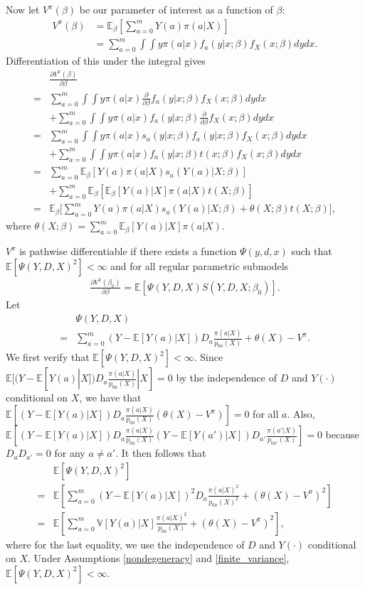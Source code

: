 \documentclass[letterpaper]{article} \usepackage{aaai19}  \usepackage{times}  \usepackage{helvet}  \usepackage{courier}  \usepackage{url}  \usepackage{graphicx}  \frenchspacing  \usepackage{comment}
\begin{document}
Now let $V^\pi(\beta)$ be our parameter of interest as a function of $\beta$:
\begin{align*}
	V^\pi(\beta)&=\mathbb{E}_{\beta}[\sum_{a=0}^m Y(a)\pi(a|X)]\\
	&=\sum_{a=0}^m \int\int y\pi(a|x) f_a(y|x;\beta)f_X(x;\beta)dydx.
\end{align*}
Differentiation of this under the integral gives
\begin{align*}
	&\frac{\partial V^\pi(\beta)}{\partial \beta} \\
	=& \sum_{a=0}^m \int\int y\pi(a|x) \frac{\partial}{\partial \beta}f_a(y|x;\beta)f_X(x;\beta)dydx\\
	&+\sum_{a=0}^m \int\int y\pi(a|x)f_a(y|x;\beta)\frac{\partial}{\partial \beta}f_X(x;\beta)dydx\\
	=& \sum_{a=0}^m \int\int y\pi(a|x) s_a(y|x;\beta) f_a(y|x;\beta)f_X(x;\beta)dydx\\
	&+\sum_{a=0}^m \int\int y\pi(a|x)f_a(y|x;\beta) t(x;\beta)f_X(x;\beta)dydx\\
	=& \sum_{a=0}^m \mathbb{E}_{\beta}[Y(a)\pi(a|X)s_a(Y(a)|X;\beta)]\\
	&+\sum_{a=0}^m \mathbb{E}_{\beta}[\mathbb{E}_{\beta}[Y(a)|X]\pi(a|X)t(X;\beta)]\\
	=& \mathbb{E}_{\beta}\bigl[\sum_{a=0}^m Y(a)\pi(a|X)s_a(Y(a)|X;\beta)+\theta(X;\beta)t(X;\beta)\bigr],
\end{align*}
where $\theta(X;\beta)=\sum_{a=0}^m \mathbb{E}_{\beta}[Y(a)|X]\pi(a|X)$.

$V^\pi$ is pathwise differentiable if there exists a function $\Psi(y,d,x)$ such that $\mathbb{E}[\Psi(Y,D,X)^2]<\infty$ and for all regular parametric submodels
\begin{align}\label{eq:pathwise_dif}
	\frac{\partial V^\pi(\beta_0)}{\partial \beta}=\mathbb{E}[\Psi(Y,D,X)S(Y,D,X;\beta_0)].
\end{align}
Let
\begin{align*}
	&\Psi(Y,D,X)\\
	=&\sum_{a=0}^m(Y-\mathbb{E}[Y(a)|X])D_a\frac{\pi(a|X)}{p_{0a}(X)}+\theta(X)-V^\pi.
\end{align*}
We first verify that $\mathbb{E}[\Psi(Y,D,X)^2]<\infty$.
Since $\mathbb{E}[(Y-\mathbb{E}[Y(a)|X])D_a\frac{\pi(a|X)}{p_{0a}(X)}|X]=0$ by the independence of $D$ and $Y(\cdot)$ conditional on $X$, we have that $\mathbb{E}[(Y-\mathbb{E}[Y(a)|X])D_a\frac{\pi(a|X)}{p_{0a}(X)}(\theta(X)-V^{\pi})]=0$ for all $a$. Also, $\mathbb{E}[(Y-\mathbb{E}[Y(a)|X])D_a\frac{\pi(a|X)}{p_{0a}(X)} (Y-\mathbb{E}[Y(a')|X])D_{a'}\frac{\pi(a'|X)}{p_{0a'}(X)}]=0$ because $D_aD_{a'}=0$ for any $a\neq a'$.
It then follows that
\begin{align*}
	&\mathbb{E}[\Psi(Y,D,X)^2]\\
	=& \mathbb{E}[\sum_{a=0}^m (Y-\mathbb{E}[Y(a)|X])^2D_a\frac{\pi(a|X)^2}{p_{0a}(X)^2}+(\theta(X)-V^{\pi})^2]\\
	=&\mathbb{E}[\sum_{a=0}^m \mathbb{V}[Y(a)|X]\frac{\pi(a|X)^2}{p_{0a}(X)}+(\theta(X)-V^{\pi})^2],
\end{align*}
where for the last equality, we use the independence of $D$ and $Y(\cdot)$ conditional on $X$.
Under Assumptions \ref{nondegeneracy} and \ref{finite_variance}, $\mathbb{E}[\Psi(Y,D,X)^2]<\infty$.
\end{document}
